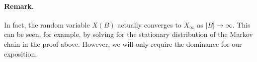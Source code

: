   \paragraph{Remark.} 
  In fact, the random variable $X(B)$
  actually converges to $X_\infty$ as $|B| \rightarrow \infty$. 
  This can be seen, for example, 
  by solving for the stationary distribution of the Markov chain in the proof above. 
  However, we will only require the dominance for our exposition. 

